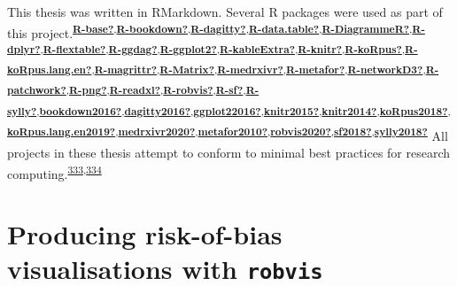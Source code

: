 \documentclass[a4paper, twoside]{templates/ociamthesis}
\begin{document}
This thesis was written in RMarkdown. Several R packages were used as part of this project.\textsuperscript{\protect\hyperlink{ref-R-base}{\textbf{R-base?}},\protect\hyperlink{ref-R-bookdown}{\textbf{R-bookdown?}},\protect\hyperlink{ref-R-dagitty}{\textbf{R-dagitty?}},\protect\hyperlink{ref-R-data.table}{\textbf{R-data.table?}},\protect\hyperlink{ref-R-DiagrammeR}{\textbf{R-DiagrammeR?}},\protect\hyperlink{ref-R-dplyr}{\textbf{R-dplyr?}},\protect\hyperlink{ref-R-flextable}{\textbf{R-flextable?}},\protect\hyperlink{ref-R-ggdag}{\textbf{R-ggdag?}},\protect\hyperlink{ref-R-ggplot2}{\textbf{R-ggplot2?}},\protect\hyperlink{ref-R-kableExtra}{\textbf{R-kableExtra?}},\protect\hyperlink{ref-R-knitr}{\textbf{R-knitr?}},\protect\hyperlink{ref-R-koRpus}{\textbf{R-koRpus?}},\protect\hyperlink{ref-R-koRpus.lang.en}{\textbf{R-koRpus.lang.en?}},\protect\hyperlink{ref-R-magrittr}{\textbf{R-magrittr?}},\protect\hyperlink{ref-R-Matrix}{\textbf{R-Matrix?}},\protect\hyperlink{ref-R-medrxivr}{\textbf{R-medrxivr?}},\protect\hyperlink{ref-R-metafor}{\textbf{R-metafor?}},\protect\hyperlink{ref-R-networkD3}{\textbf{R-networkD3?}},\protect\hyperlink{ref-R-patchwork}{\textbf{R-patchwork?}},\protect\hyperlink{ref-R-png}{\textbf{R-png?}},\protect\hyperlink{ref-R-readxl}{\textbf{R-readxl?}},\protect\hyperlink{ref-R-robvis}{\textbf{R-robvis?}},\protect\hyperlink{ref-R-sf}{\textbf{R-sf?}},\protect\hyperlink{ref-R-sylly}{\textbf{R-sylly?}},\protect\hyperlink{ref-bookdown2016}{\textbf{bookdown2016?}},\protect\hyperlink{ref-dagitty2016}{\textbf{dagitty2016?}},\protect\hyperlink{ref-ggplot22016}{\textbf{ggplot22016?}},\protect\hyperlink{ref-knitr2015}{\textbf{knitr2015?}},\protect\hyperlink{ref-knitr2014}{\textbf{knitr2014?}},\protect\hyperlink{ref-koRpus2018}{\textbf{koRpus2018?}},\protect\hyperlink{ref-koRpus.lang.en2019}{\textbf{koRpus.lang.en2019?}},\protect\hyperlink{ref-medrxivr2020}{\textbf{medrxivr2020?}},\protect\hyperlink{ref-metafor2010}{\textbf{metafor2010?}},\protect\hyperlink{ref-robvis2020}{\textbf{robvis2020?}},\protect\hyperlink{ref-sf2018}{\textbf{sf2018?}},\protect\hyperlink{ref-sylly2018}{\textbf{sylly2018?}}}
All projects in these thesis attempt to conform to minimal best practices for research computing.\textsuperscript{\protect\hyperlink{ref-wilson2014}{333},\protect\hyperlink{ref-wilson2017}{334}}

\hypertarget{appendix-robvis}{%
\section{\texorpdfstring{Producing risk-of-bias visualisations with \texttt{robvis}}{Producing risk-of-bias visualisations with robvis}}\label{appendix-robvis}}
\end{document}

